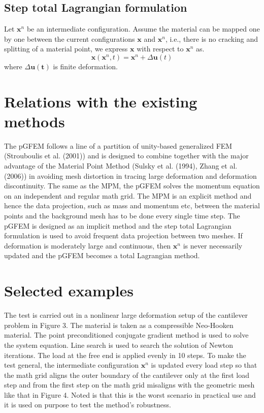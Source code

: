 \documentclass{acm_proc_article-sp}
\begin{document}
\subsection{Step total Lagrangian formulation}
Let $\textbf{x}^n$ be an intermediate configuration. Assume the material can be mapped one by one between the current configurations $\textbf{x}$ and $\textbf{x}^n$, i.e., there is no cracking and splitting of a material point, we express $\textbf{x}$ with respect to $\textbf{x}^n$ as\cite{Lamport:LaTeX}.
\begin{equation}
\textbf{x}(\textbf{x}^n,t) = \textbf{x}^n + \Delta\textbf{u}(t)
\end{equation}
where $\Delta\textbf{u}(\textbf{t})$ is finite deformation.

\section{Relations with the existing methods}
The pGFEM follows a line of a partition of unity-based generalized FEM (Strouboulis et al. (2001)) and is designed to combine together with the major advantage of the Material Point Method (Sulsky et al. (1994), Zhang et al. (2006)) in avoiding mesh distortion in tracing large deformation and deformation discontinuity. The same as the MPM, the pGFEM solves the momentum equation on an independent and regular math grid. The MPM is an explicit method and hence the data projection, such as mass and momentum etc, between the material points and the background mesh has to be done every single time step.\cite{clark:pct} The pGFEM is designed as an implicit method and the step total Lagrangian formulation is used to avoid frequent data projection between two meshes. If deformation is moderately large and continuous, then $\textbf{x}^n$ is never necessarily updated and the pGFEM becomes a total Lagrangian method.

\section{Selected examples}
The test is carried out in a nonlinear large deformation setup of the cantilever problem in Figure 3. The material is taken as a compressible Neo-Hooken material. The point preconditioned conjugate gradient method is used to solve the system equation. Line search is used to search the solution of Newton iterations. The load at the free end is applied evenly in 10 steps. To make the test general, the intermediate configuration $\textbf{x}^n$ is updated every load step so that the math grid aligns the outer boundary of the cantilever only at the first load step and from the first step on the math grid misaligns with the geometric mesh like that in Figure 4. Noted is that this is the worst scenario in practical use and it is used on purpose to test the method's robustness.\cite{herlihy:methodology}
\end{document}
